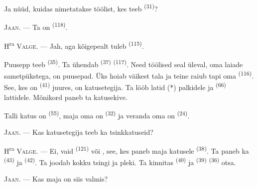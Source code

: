 Ja nüüd, kuidas nimetatakse töölist, kes teeb  \textsuperscript{(31)}?

\textsc{Jaan}. --- Ta on  \textsuperscript{(118)}.

\VUsaut{3.0mm}
\VUsaut{3.0mm}

H\textsuperscript{ra} \textsc{Valge}. --- Jah, aga kõigepealt tuleb 
\textsuperscript{(115)}.

Puusepp teeb  \textsuperscript{(35)}. Ta ühendab
 \textsuperscript{(37)}  \textsuperscript{(117)}. Need
töölised seal üleval, oma laiade sametpükstega, on puusepad. Üks hoiab väikest tala ja
teine raiub tapi oma  \textsuperscript{(116)}. See, kes on
 \textsuperscript{(41)} juures, on katusetegija. Ta lööb latid (*)
palkidele ja  \textsuperscript{(66)} lattidele. Mõnikord paneb ta
katusekive.


Talli katus on  \textsuperscript{(55)}, maja oma on
 \textsuperscript{(32)} ja veranda oma on 
\textsuperscript{(24)}.

\textsc{Jaan}. --- Kas katusetegija teeb ka tsinkkatuseid?

H\textsuperscript{ra} \textsc{Valge}. --- Ei, vaid 
\textsuperscript{(121)} või , see, kes paneb maja katusele
 \textsuperscript{(38)}. Ta paneb ka 
\textsuperscript{(43)} ja  \textsuperscript{(42)}. Ta joodab kokku
tsingi ja pleki. Ta kinnitas  \textsuperscript{(40)} ja
 \textsuperscript{(39)}  \textsuperscript{(36)} otsa.

\textsc{Jaan}. --- Kas maja on siis valmis?

